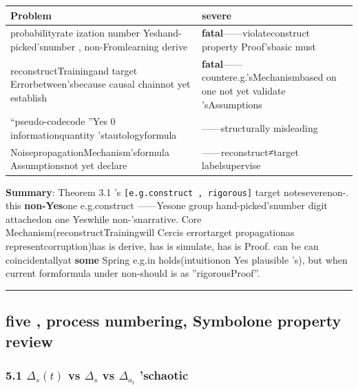 \documentclass[
  12pt,
]{article}
\begin{document}
\begin{longtable}[]{@{}
  >{\raggedright\arraybackslash}p{}
  >{\raggedright\arraybackslash}p{}@{}}
\toprule\noalign{}
\begin{minipage}[b]{\linewidth}\raggedright
Problem
\end{minipage} & \begin{minipage}[b]{\linewidth}\raggedright
severe
\end{minipage} \\
\midrule\noalign{}
\endhead
\bottomrule\noalign{}
\endlastfoot
probabilityrate ization number Yeshand-picked'snumber , non-Fromlearning derive &
\textbf{fatal}------violateconstruct property Proof'sbasic must  \\
reconstructTrainingand target Errorbetween'sbecause causal chainnot yet establish  &
\textbf{fatal}------countere.g.'sMechanismbased on one not yet validate 'sAssumptions \\
``pseudo-codecode ''Yes 0 informationquantity 'stautologyformula  & \textbf{}------structurally misleading \\
NoisepropagationMechanism'sformula Assumptionsnot yet declare & \textbf{}------reconstruct≠target labelsupervise \\
\end{longtable}

\textbf{Summary}: Theorem 3.1 's \texttt{{[}e.g.construct , rigorous{]}}
target noteseverenon-. this \textbf{non-Yes}one e.g.construct ------Yesone group hand-picked'snumber digit attachedon one Yeswhile non-'snarrative. Core Mechanism(reconstructTrainingwill 
Cercis
errortarget propagationas representcorruption)has is derive, has is simulate, has is Proof. can be can coincidentallyat \textbf{some }Spring
e.g.in holds(intuitionon Yes plausible
's), but when current formformula under non-should is as ''rigorousProof''. 

\begin{center}\rule{0.5\linewidth}{0.5pt}\end{center}

\subsection{five , process numbering, Symbolone property review}\label{ux4e94ux65b9ux7a0bux7f16ux53f7ux7b26ux53f7ux4e00ux81f4ux6027ux5ba1ux67e5}

\subsubsection{\texorpdfstring{5.1 \(\Delta_s(t)\) vs \(\Delta_s\) vs
\(\Delta_{a_t}\)
'schaotic}{5.1 \textbackslash Delta\_s(t) vs \textbackslash Delta\_s vs \textbackslash Delta\_\{a\_t\} 'schaotic}}\label{delta_st-vs-delta_s-vs-delta_a_t-ux7684ux6df7ux4e71}
\end{document}
